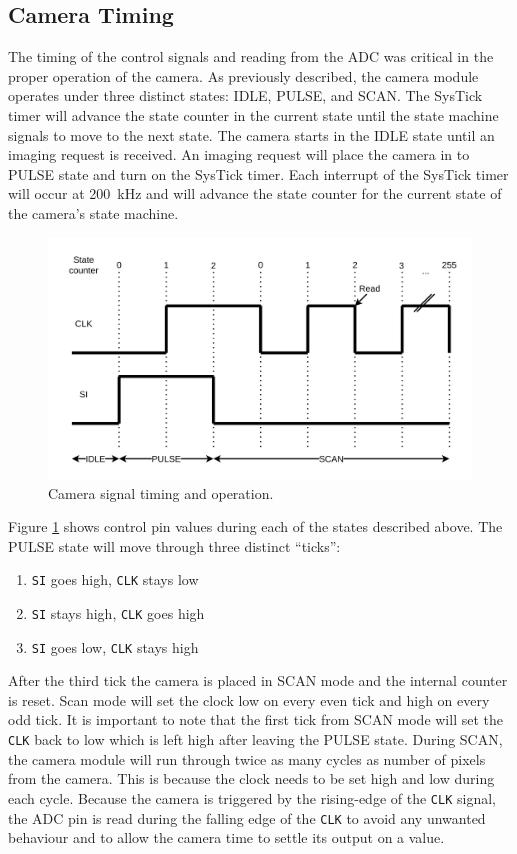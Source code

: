 \documentclass[CMPE]{../KGCOEReport}
\def\code#1{\texttt{#1}}
\begin{document}
	\subsection*{Camera Timing}

	The timing of the control signals and reading from the ADC was critical in the
	proper operation of the camera. As previously described, the camera module operates
	under three distinct states: IDLE, PULSE, and SCAN. The SysTick timer will advance
	the state counter in the current state until the state machine signals to move to
	the next state. The camera starts in the IDLE state until an imaging request is received.
	An imaging request will place the camera in to PULSE state and turn on the SysTick
	timer. Each interrupt of the SysTick timer will occur at \SI{200}{\kilo\Hz} and will
	advance the state counter for the current state of the camera's state machine.

	 \begin{figure}[h!]
        \centering
        \includegraphics[width=12cm]{cam_timing}
        \caption{Camera signal timing and operation.}
        \label{fig:cam_tim}
	\end{figure}

	Figure \ref{fig:cam_tim} shows control pin values during each of the states
	described above. The PULSE state will move through three distinct ``ticks'':

	\begin{enumerate}
	\item \code{SI} goes high,
	      \code{CLK} stays low
	\item \code{SI} stays high,
		  \code{CLK} goes high
	\item \code{SI} goes low,
		  \code{CLK} stays high
	\end{enumerate}

	After the third tick the camera is placed in SCAN mode and the internal counter is
	reset. Scan mode will set the clock low on every even tick and high on every odd tick.
	It is important to note
	that the first tick from SCAN mode will set the \code{CLK} back to low which is left
	high after leaving the PULSE state. During
	SCAN, the camera module will run through twice as many cycles as number of pixels
	from the camera. This is because the clock needs to be set high and low during each
	cycle. Because the camera is triggered by the rising-edge of the \code{CLK} signal,
	the ADC pin is read during the falling edge of the \code{CLK} to avoid any unwanted
	behaviour and to allow the camera time to settle its output on a value.
\end{document}
